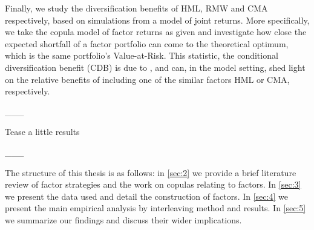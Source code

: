 Finally, we study the diversification benefits of HML, RMW and CMA respectively, based on simulations from a model of joint returns. More specifically, we take the copula model of factor returns as given and investigate how close the expected shortfall of a factor portfolio can come to the theoretical optimum, which is the same portfolio's Value-at-Risk. This statistic, the conditional diversification benefit (CDB) is due to \textcite{ChristoffersenErrunzaJacobLanglois2012}, and can, in the model setting, shed light on the relative benefits of including one of the similar factors HML or CMA, respectively.

___

Tease a little results
 
___

The structure of this thesis is as follows: in \autoref{sec:2} we provide a brief literature review of factor strategies and the work on copulas relating to factors. In \autoref{sec:3} we present the data used and detail the construction of factors. In \autoref{sec:4} we present the main empirical analysis by interleaving method and results. In \autoref{sec:5} we summarize our findings and discuss their wider implications.
